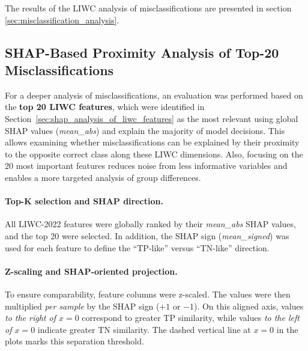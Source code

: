 The results of the LIWC analysis of misclassifications are presented in section \ref{sec:misclassification_analysis}.

\subsection{SHAP-Based Proximity Analysis of Top-20 Misclassifications}


For a deeper analysis of misclassifications, an evaluation was performed based on the \textbf{top 20 LIWC features}, which were identified in Section~\ref{sec:shap_analysis_of_liwc_features} as the most relevant using global SHAP values (\emph{mean\_abs}) and explain the majority of model decisions. This allows examining whether misclassifications can be explained by their proximity to the opposite correct class along these LIWC dimensions. Also, focusing on the 20 most important features reduces noise from less informative variables and enables a more targeted analysis of group differences.

\paragraph{Top-K selection and SHAP direction.}
All LIWC-2022 features were globally ranked by their \emph{mean\_abs} SHAP values, and the top 20 were selected. In addition, the SHAP sign (\emph{mean\_signed}) was used for each feature to define the “TP-like” versus “TN-like” direction.

\paragraph{Z-scaling and SHAP-oriented projection.}
To ensure comparability, feature columns were z-scaled. The values were then multiplied \emph{per sample} by the SHAP sign (\(+1\) or \(-1\)). On this aligned axis, values \emph{to the right of \(x=0\)} correspond to greater TP similarity, while values \emph{to the left of \(x=0\)} indicate greater TN similarity. The dashed vertical line at \(x=0\) in the plots marks this separation threshold.

